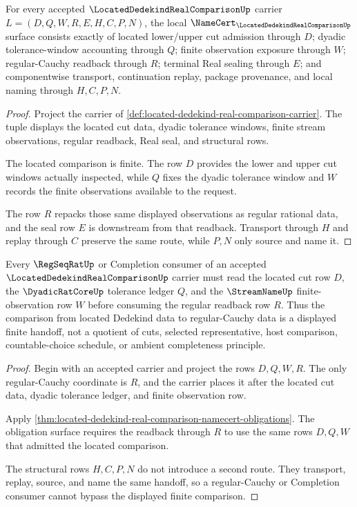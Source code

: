 \begin{theorem}
\label{thm:located-dedekind-real-comparison-namecert-obligations}
For every accepted $\LocatedDedekindRealComparisonUp$ carrier $L=(D,Q,W,R,E,H,C,P,N)$, the local $\NameCert_{\LocatedDedekindRealComparisonUp}$ surface consists exactly of located lower/upper cut admission through $D$; dyadic tolerance-window accounting through $Q$; finite observation exposure through $W$; regular-Cauchy readback through $R$; terminal Real sealing through $E$; and componentwise transport, continuation replay, package provenance, and local naming through $H,C,P,N$.
\end{theorem}
\begin{proof}
Project the carrier of \autoref{def:located-dedekind-real-comparison-carrier}. The tuple displays the located cut data, dyadic tolerance windows, finite stream observations, regular readback, Real seal, and structural rows.

The located comparison is finite. The row $D$ provides the lower and upper cut windows actually inspected, while $Q$ fixes the dyadic tolerance window and $W$ records the finite observations available to the request.

The row $R$ repacks those same displayed observations as regular rational data, and the seal row $E$ is downstream from that readback. Transport through $H$ and replay through $C$ preserve the same route, while $P,N$ only source and name it.
\end{proof}

\begin{theorem}
\label{thm:located-dedekind-real-comparison-regular-cauchy-handoff}
Every $\RegSeqRatUp$ or Completion consumer of an accepted $\LocatedDedekindRealComparisonUp$ carrier must read the located cut row $D$, the $\DyadicRatCoreUp$ tolerance ledger $Q$, and the $\StreamNameUp$ finite-observation row $W$ before consuming the regular readback row $R$. Thus the comparison from located Dedekind data to regular-Cauchy data is a displayed finite handoff, not a quotient of cuts, selected representative, host comparison, countable-choice schedule, or ambient completeness principle.
\end{theorem}
\begin{proof}
Begin with an accepted carrier and project the rows $D,Q,W,R$. The only regular-Cauchy coordinate is $R$, and the carrier places it after the located cut data, dyadic tolerance ledger, and finite observation row.

Apply \autoref{thm:located-dedekind-real-comparison-namecert-obligations}. The obligation surface requires the readback through $R$ to use the same rows $D,Q,W$ that admitted the located comparison.

The structural rows $H,C,P,N$ do not introduce a second route. They transport, replay, source, and name the same handoff, so a regular-Cauchy or Completion consumer cannot bypass the displayed finite comparison.
\end{proof}

